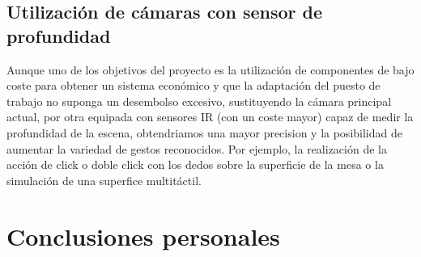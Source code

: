 \subsection{Utilización de cámaras con sensor de profundidad} 

Aunque uno de los objetivos del proyecto es la utilización de componentes de bajo coste para obtener un sistema económico y que la adaptación del puesto de trabajo no suponga un desembolso excesivo, sustituyendo la cámara principal actual, por otra equipada con sensores IR (con un coste mayor) capaz de medir la profundidad de la escena, obtendriamos una mayor precision y la posibilidad de aumentar la variedad de gestos reconocidos. Por ejemplo, la realización de la acción de click o doble click con los dedos sobre la superficie de la mesa o la simulación de una superfice multitáctil.

\section{Conclusiones personales}